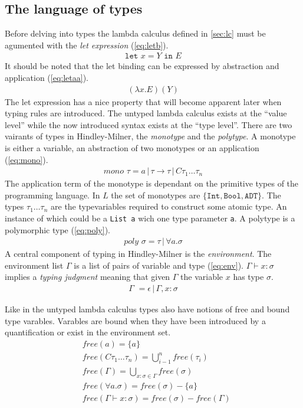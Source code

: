 \documentclass[11pt,oneside,a4paper]{report}
\begin{document}
\subsection{The language of types}
Before delving into types the lambda calculus defined in \autoref{sec:lc} must be agumented with the \textit{let expression} (\autoref{eq:letb}).
\begin{align}
    \texttt{let } x = Y \texttt{ in } E
    \label{eq:letb}
\end{align}
It should be noted that the let binding can be expressed by abstraction and application (\autoref{eq:letaa}).
\begin{align}
    (\lambda x . E) (Y)
    \label{eq:letaa}
\end{align}
The let expression has a nice property that will become apparent later when typing rules are introduced.
The untyped lambda calculus exists at the ``value level'' while the now introduced syntax exists at the ``type level''.
There are two vairants of types in Hindley-Milner, the \textit{monotype} and the \textit{polytype}.
A monotype is either a variable, an abstraction of two monotypes or an application (\autoref{eq:mono}).
\begin{align}
    mono \,\,\tau = a \,|\, \tau \rightarrow \tau \,|\, C \tau_1 \dots \tau_n
    \label{eq:mono}
\end{align}
The application term of the monotype is dependant on the primitive types of the programming language.
In $L$ the set of monotypes are $\{ \texttt{Int}, \texttt{Bool}, \texttt{ADT} \}$.
The types $\tau_1 \dots \tau_n$ are the typevariables required to construct some atomic type.
An instance of which could be a \texttt{List a} wich one type parameter \texttt{a}.
A polytype is a polymorphic type (\autoref{eq:poly}).
\begin{align}
    poly \,\, \sigma = \tau \,|\, \forall a . \sigma
    \label{eq:poly}
\end{align}
A central component of typing in Hindley-Milner is the \textit{environment}.
The environment list $\Gamma$ is a list of pairs of variable and type (\autoref{eq:env}).
$\Gamma \vdash x: \sigma$ implies a \textit{typing judgment} meaning that given $\Gamma$ the variable $x$ has type $\sigma$.
\begin{align}
    \Gamma \,\, = \epsilon \,|\, \Gamma, x : \sigma
    \label{eq:env}
\end{align}

Like in the untyped lambda calculus types also have notions of free and bound type varables.
Varables are bound when they have been introduced by a quantification or exist in the environment set.
\begin{align}
    &free(a) = \{ a \}\\
    &free(C \tau_1 \dots \tau_n ) = \bigcup_{i-1}^n free(\tau_i)\\
    &free(\Gamma) = \bigcup_{x:\sigma \in \Gamma} free(\sigma)\\
    &free(\forall a . \sigma) = free(\sigma) - \{ a \}\\
    &free(\Gamma \vdash x : \sigma) = free(\sigma) - free(\Gamma)
\end{align}
\end{document}
